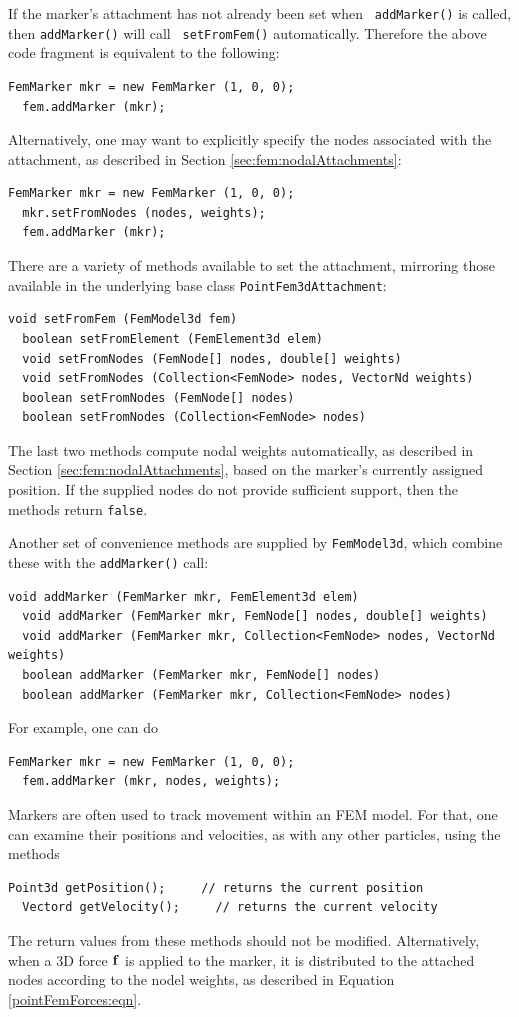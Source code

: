 If the marker's attachment has not already been set when {\tt
addMarker()} is called, then {\tt addMarker()} will call {\tt
setFromFem()} automatically. Therefore the above code fragment is
equivalent to the following:
%
\begin{lstlisting}[]
  FemMarker mkr = new FemMarker (1, 0, 0);
  fem.addMarker (mkr);
\end{lstlisting}
%
Alternatively, one may want to explicitly specify the nodes
associated with the attachment, as described in Section 
\ref{sec:fem:nodalAttachments}:
%
\begin{lstlisting}[]
  FemMarker mkr = new FemMarker (1, 0, 0);
  mkr.setFromNodes (nodes, weights);
  fem.addMarker (mkr);
\end{lstlisting}
%
There are a variety of methods available to set the attachment, mirroring
those available in the underlying base class {\tt PointFem3dAttachment}:
\begin{lstlisting}[]
  void setFromFem (FemModel3d fem)
  boolean setFromElement (FemElement3d elem)
  void setFromNodes (FemNode[] nodes, double[] weights)
  void setFromNodes (Collection<FemNode> nodes, VectorNd weights)
  boolean setFromNodes (FemNode[] nodes)
  boolean setFromNodes (Collection<FemNode> nodes)
\end{lstlisting}
The last two methods compute nodal weights automatically, as described
in Section \ref{sec:fem:nodalAttachments}, based on the marker's
currently assigned position. If the supplied nodes do not provide
sufficient support, then the methods return {\tt false}.

Another set of convenience methods are supplied by {\tt FemModel3d},
which combine these with the {\tt addMarker()} call:
%
\begin{lstlisting}[]
  void addMarker (FemMarker mkr, FemElement3d elem)
  void addMarker (FemMarker mkr, FemNode[] nodes, double[] weights)
  void addMarker (FemMarker mkr, Collection<FemNode> nodes, VectorNd weights)
  boolean addMarker (FemMarker mkr, FemNode[] nodes)
  boolean addMarker (FemMarker mkr, Collection<FemNode> nodes)
\end{lstlisting}
%
For example, one can do
%
\begin{lstlisting}[]
  FemMarker mkr = new FemMarker (1, 0, 0);
  fem.addMarker (mkr, nodes, weights);
\end{lstlisting}
%

Markers are often used to track movement within an FEM model.
For that, one can examine their positions and velocities,
as with any other particles, using the methods
%
\begin{lstlisting}[]
  Point3d getPosition();     // returns the current position
  Vectord getVelocity();     // returns the current velocity
\end{lstlisting}
%
The return values from these methods should not be
modified. Alternatively, when a 3D force ${\bf f}$ is applied to the
marker, it is distributed to the attached nodes according to the nodel
weights, as described in Equation \eqref{pointFemForces:eqn}.

